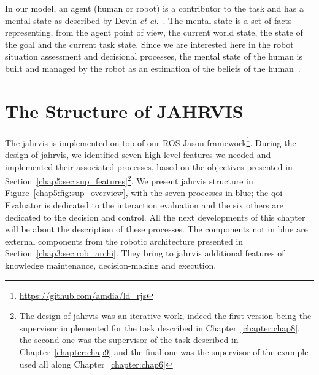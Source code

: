 \documentclass[a4paper,11pt,twoside]{StyleThese}
\begin{document}
In our model, an agent (human or robot) is a contributor to the task and has a mental state as described by Devin \textit{et al}.~\cite{devin_2016_implemented}. The mental state is a set of facts representing, from the agent point of view, the current world state, the state of the goal and the current task state. Since we are interested here in the robot situation assessment and decisional processes, the mental state of the human is built and managed by the robot as an estimation of the beliefs of the human~\cite{milliez_2014_framework, hiatt_2017_modeling,tabrez_2020}.

\section{The Structure of JAHRVIS}\label{chap5:sec:jahrvis}
The \acrfull{jahrvis} is implemented on top of our ROS-Jason framework\footnote{\url{https://github.com/amdia/ld_rjs}}. During the design of \acrshort{jahrvis}, we identified seven high-level features we needed and implemented their associated processes, based on the objectives presented in Section~\ref{chap5:sec:sup_features}\footnote{The design of \acrshort{jahrvis} was an iterative work, indeed the first version being the supervisor implemented for the task described in Chapter~\ref{chapter:chap8}, the second one was the supervisor of the task described in Chapter~\ref{chapter:chap9} and the final one was the supervisor of the example used all along Chapter~\ref{chapter:chap6}}. We present \acrshort{jahrvis} structure in Figure~\ref{chap5:fig:sup_overview}, with the seven processes in blue; the \acrshort{qoi} Evaluator is dedicated to the interaction evaluation and the six others are dedicated to the decision and control. All the next developments of this chapter will be about the description of these processes. The components not in blue are external components from the robotic architecture presented in Section~\ref{chap3:sec:rob_archi}. They bring to \acrshort{jahrvis} additional features of knowledge maintenance, decision-making and execution.
\end{document}
